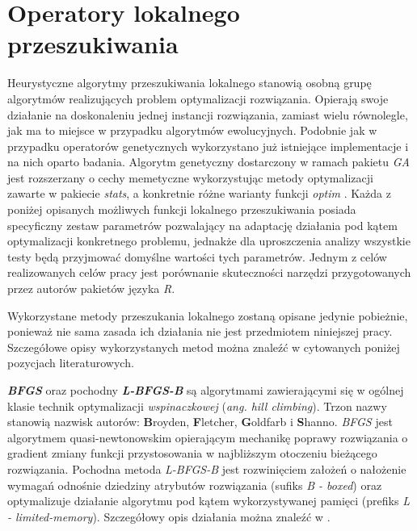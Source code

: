 \section{Operatory lokalnego przeszukiwania}
\label{sec:operatory_lokalnego_przeszukiwania}
\par
Heurystyczne algorytmy przeszukiwania lokalnego stanowią osobną grupę algorytmów realizujących problem optymalizacji rozwiązania. Opierają swoje działanie na doskonaleniu jednej instancji rozwiązania, zamiast wielu równolegle, jak ma to miejsce w przypadku algorytmów ewolucyjnych. Podobnie jak w przypadku operatorów genetycznych wykorzystano już istniejące implementacje i na nich oparto badania. Algorytm genetyczny dostarczony w ramach pakietu \emph{GA} \cite{gaPackage} jest rozszerzany o cechy memetyczne wykorzystując metody optymalizacji zawarte w pakiecie \emph{stats}, a konkretnie różne warianty funkcji \emph{optim} \cite{statsPackage}. Każda z poniżej opisanych możliwych funkcji lokalnego przeszukiwania posiada specyficzny zestaw parametrów pozwalający na adaptację działania pod kątem optymalizacji konkretnego problemu, jednakże dla uproszczenia analizy wszystkie testy będą przyjmować domyślne wartości tych parametrów. Jednym z celów realizowanych celów pracy jest porównanie skuteczności narzędzi przygotowanych przez autorów pakietów języka \emph{R}.
\par
Wykorzystane metody przeszukania lokalnego zostaną opisane jedynie pobieżnie, ponieważ nie sama zasada ich działania nie jest przedmiotem niniejszej pracy. Szczegółowe opisy wykorzystanych metod można znaleźć w cytowanych poniżej pozycjach literaturowych.
\par
\textbf{\emph{BFGS}} oraz pochodny \textbf{\emph{L-BFGS-B}} są algorytmami zawierającymi się w ogólnej klasie technik optymalizacji \emph{wspinaczkowej} (\emph{ang. hill climbing}). Trzon nazwy stanowią nazwisk autorów:  \textbf{B}royden, \textbf{F}letcher, \textbf{G}oldfarb i \textbf{S}hanno. \emph{BFGS} jest algorytmem quasi-newtonowskim opierającym mechanikę poprawy rozwiązania o gradient zmiany funkcji przystosowania w najbliższym otoczeniu bieżącego rozwiązania. Pochodna metoda \emph{L-BFGS-B} jest rozwinięciem założeń o nałożenie wymagań odnośnie dziedziny atrybutów rozwiązania (sufiks \emph{B - boxed}) oraz optymalizuje działanie algorytmu pod kątem wykorzystywanej pamięci (prefiks \emph{L - limited-memory}). Szczegółowy opis działania można znaleźć w \cite{nocedal2006numerical}. 

